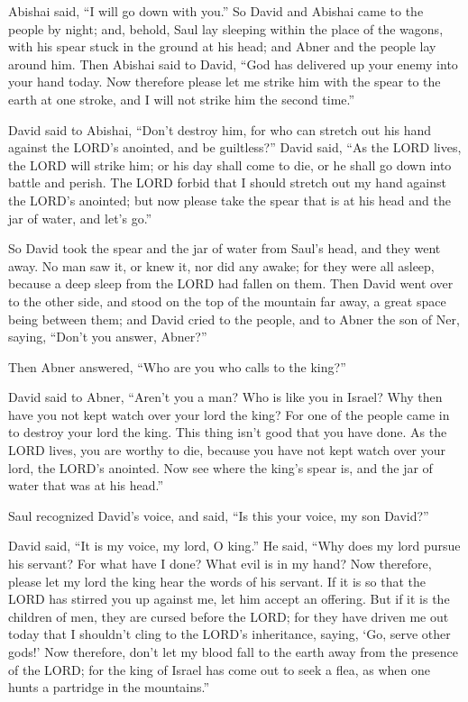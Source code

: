 Abishai said, “I will go down with you.”
\myverse{}So David and Abishai came to the people by night; and, behold, Saul lay sleeping
within the place of the wagons, with his spear stuck in the ground at his head; and Abner and the people
lay around him.
\myverse{}Then Abishai said to David, “God has delivered up your enemy into your hand
today. Now therefore please let me strike him with the spear to the earth at one stroke, and I will not
strike him the second time.”

\myverse{}David said to Abishai, “Don’t destroy him, for who can stretch
out his hand against the LORD’s anointed, and be guiltless?”
\myverse{}David said, “As the LORD lives, the LORD will strike him; or his day shall
come to die, or he shall go down into battle and perish.
\myverse{}The LORD forbid that I should stretch out my hand against the LORD’s anointed;
but now please take the spear that is at his head and the jar of water, and let’s go.”

\myverse{}So David took the spear and the jar of water from Saul’s head,
and they went away. No man saw it, or knew it, nor did any awake; for they were all asleep, because a
deep sleep from the LORD had fallen on them.
\myverse{}Then David went over to the other side, and stood on the top of the mountain
far away, a great space being between them;
\myverse{}and David cried to the people, and to Abner the son of Ner, saying, “Don’t
you answer, Abner?”

Then Abner answered, “Who are you who calls to the king?”

\myverse{}David said to Abner, “Aren’t you a man? Who is like you in Israel?
Why then have you not kept watch over your lord the king? For one of the people came in to destroy your
lord the king.
\myverse{}This thing isn’t good that you have done. As the LORD lives, you are worthy
to die, because you have not kept watch over your lord, the LORD’s anointed. Now see where the king’s
spear is, and the jar of water that was at his head.”

\myverse{}Saul recognized David’s voice, and said, “Is this your voice,
my son David?”

David said, “It is my voice, my lord, O king.”
\myverse{}He said, “Why does my lord pursue his servant? For what have I done? What
evil is in my hand?
\myverse{}Now therefore, please let my lord the king hear the words of his servant.
If it is so that the LORD has stirred you up against me, let him accept an offering. But if it is the
children of men, they are cursed before the LORD; for they have driven me out today that I shouldn’t cling
to the LORD’s inheritance, saying, ‘Go, serve other gods!’
\myverse{}Now therefore, don’t let my blood fall to the earth away from the presence
of the LORD; for the king of Israel has come out to seek a flea, as when one hunts a partridge in the
mountains.”

